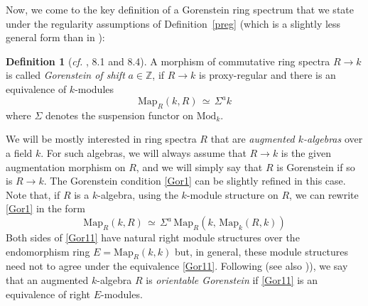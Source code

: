 \documentclass[11pt]{amsart}
\theoremstyle{definition}
\newtheorem{defi}[theorem]{Definition}
\theoremstyle{remark}
\numberwithin{equation}{section}
\newcommand{\la}{\label}
\newcommand{\Map}{\mathrm{Map}}
\def\Z{\mathbb{Z}}
\def\Mod{\mathrm{Mod}}
\begin{document}
Now, we come to the key definition of a Gorenstein ring spectrum that we state under
the regularity assumptions of Definition~\ref{preg} (which is a slightly less general form than in \cite{DGI06}):
%
\begin{defi}[{\it cf.} \cite{DGI06}, 8.1 and 8.4]
\la{defGor}
A morphism of commutative ring spectra $R \to k $ is called {\it Gorenstein of shift} $a \in \Z$, if $R \to k $ is proxy-regular and there is an equivalence of $k$-modules
%
\begin{equation}
\la{Gor1}
\Map_{R}(k, R) \,\simeq\, \Sigma^a k    
\end{equation}
%
where $\Sigma$ denotes the suspension functor on $ \Mod_k $.
\end{defi}
%

We will be mostly interested in ring spectra $R$ that are {\it augmented $k$-algebras} over a field $k$. For such algebras, we will always assume that $ R \to k $ is the given augmentation morphism on $R$, and we will simply say that $R$ is Gorenstein if so is $ R \to k $. The Gorenstein condition \eqref{Gor1} can be slightly refined in this case. Note that, if $R$ is a $k$-algebra, using the $k$-module structure on $R$, we can rewrite \eqref{Gor1} in the form
%
\begin{equation}
\la{Gor11}
\Map_{R}(k, R) \,\simeq\, \Sigma^a\, \Map_{R}(k,\, \Map_k(R,k))    
\end{equation}
%
Both sides of \eqref{Gor11} have natural right module structures over the endomorphism
ring $ E = \Map_R(k,k) $ but, in general, these module structures need not to agree under the equivalence \eqref{Gor11}. Following \cite{DGI06} (see also \cite[Section 18.2]{G18})), we say that an augmented $k$-algebra $R$ is {\it orientable Gorenstein} if \eqref{Gor11} is an equivalence of right $E$-modules. 
\end{document}
